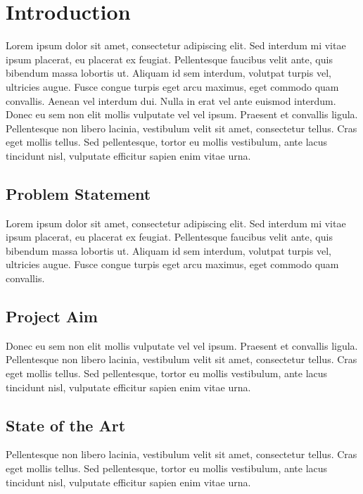 \chapter{Introduction}
Lorem ipsum dolor sit amet, consectetur adipiscing elit. Sed interdum mi vitae ipsum placerat, eu placerat ex feugiat. Pellentesque faucibus velit ante, quis bibendum massa lobortis ut. Aliquam id sem interdum, volutpat turpis vel, ultricies augue. Fusce congue turpis eget arcu maximus, eget commodo quam convallis. Aenean vel interdum dui. Nulla in erat vel ante euismod interdum. Donec eu sem non elit mollis vulputate vel vel ipsum. Praesent et convallis ligula. Pellentesque non libero lacinia, vestibulum velit sit amet, consectetur tellus. Cras eget mollis tellus. Sed pellentesque, tortor eu mollis vestibulum, ante lacus tincidunt nisl, vulputate efficitur sapien enim vitae urna.\cite{CiteExample}

\section{Problem Statement}
Lorem ipsum dolor sit amet, consectetur adipiscing elit. Sed interdum mi vitae ipsum placerat, eu placerat ex feugiat. Pellentesque faucibus velit ante, quis bibendum massa lobortis ut. Aliquam id sem interdum, volutpat turpis vel, ultricies augue. Fusce congue turpis eget arcu maximus, eget commodo quam convallis. 

\section{Project Aim}
Donec eu sem non elit mollis vulputate vel vel ipsum. Praesent et convallis ligula. Pellentesque non libero lacinia, vestibulum velit sit amet, consectetur tellus. Cras eget mollis tellus. Sed pellentesque, tortor eu mollis vestibulum, ante lacus tincidunt nisl, vulputate efficitur sapien enim vitae urna.

\section{State of the Art}
Pellentesque non libero lacinia, vestibulum velit sit amet, consectetur tellus. Cras eget mollis tellus. Sed pellentesque, tortor eu mollis vestibulum, ante lacus tincidunt nisl, vulputate efficitur sapien enim vitae urna.